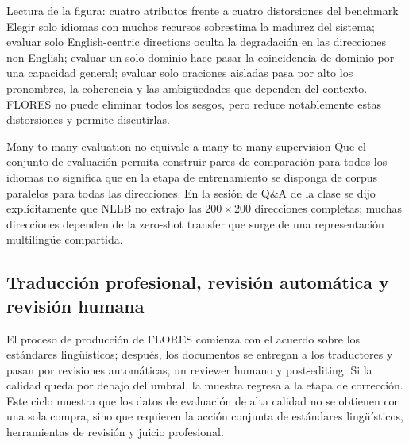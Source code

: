
\begin{knowledgebox}{Lectura de la figura: cuatro atributos frente a cuatro distorsiones del benchmark}
Elegir solo idiomas con muchos recursos sobrestima la madurez del sistema; evaluar solo English-centric directions oculta la degradación en las direcciones non-English; evaluar un solo dominio hace pasar la coincidencia de dominio por una capacidad general; evaluar solo oraciones aisladas pasa por alto los pronombres, la coherencia y las ambigüedades que dependen del contexto. FLORES no puede eliminar todos los sesgos, pero reduce notablemente estas distorsiones y permite discutirlas.
\end{knowledgebox}

\begin{warningbox}{Many-to-many evaluation no equivale a many-to-many supervision}
Que el conjunto de evaluación permita construir pares de comparación para todos los idiomas no significa que en la etapa de entrenamiento se disponga de corpus paralelos para todas las direcciones. En la sesión de Q\&A de la clase se dijo explícitamente que NLLB no extrajo las $200\times200$ direcciones completas; muchas direcciones dependen de la zero-shot transfer que surge de una representación multilingüe compartida.
\end{warningbox}

\subsection{Traducción profesional, revisión automática y revisión humana}

El proceso de producción de FLORES comienza con el acuerdo sobre los estándares lingüísticos; después, los documentos se entregan a los traductores y pasan por revisiones automáticas, un reviewer humano y post-editing. Si la calidad queda por debajo del umbral, la muestra regresa a la etapa de corrección. Este ciclo muestra que los datos de evaluación de alta calidad no se obtienen con una sola compra, sino que requieren la acción conjunta de estándares lingüísticos, herramientas de revisión y juicio profesional.


